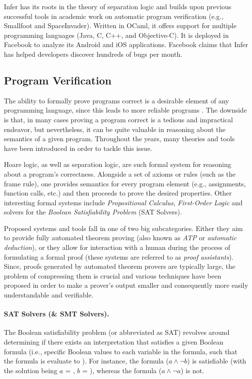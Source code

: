 Infer has its roots in the theory of separation logic and builds upon previous successful tools in academic work on automatic program verification (e.g., Smallfoot and SpaceInvader). Written in OCaml, it offers support for multiple programming languages (Java, C, C++, and Objective-C). It is deployed in Facebook to analyze its Android and iOS applications. Facebook claims that Infer has helped developers discover hundreds of bugs per month.


\subsection{Program Verification}

The ability to formally prove programs correct is a desirable element of any programming language, since this leads to more reliable programs \cite{article:1988:Fetzer,cav:2006:Bouajjani}. The downside is that, in many cases proving a program correct is a tedious and impractical endeavor, but nevertheless, it can be quite valuable in reasoning about the semantics of a given program. Throughout the years, many theories and tools have been introduced in order to tackle this issue.

Hoare logic, as well as separation logic, are such formal system for reasoning about a program's correctness. Alongside a set of axioms or rules (such as the frame rule), one provides semantics for every program element (e.g., assignments, function calls, etc.) and then proceeds to prove the desired properties. Other interesting formal systems include \emph{Propositional Calculus}, \emph{First-Order Logic} and solvers for the \emph{Boolean Satisfiability Problem} (SAT Solvers).

Proposed systems and tools fall in one of two big subcategories. Either they aim to provide fully automated theorem proving (also known as \emph{ATP} or \emph{automatic deduction}), or they allow for interaction with a human during the process of formulating a formal proof (these systems are referred to as \emph{proof assistants}). Since, proofs generated by automated theorem provers are typically large, the problem of compressing them is crucial and various techniques have been proposed in order to make a prover's output smaller and consequently more easily understandable and verifiable.


\paragraph{SAT Solvers (\& SMT Solvers).}
The Boolean satisfiability problem (or abbreviated as SAT) revolves around determining if there exists an interpretation that satisfies a given Boolean formula (i.e., specific Boolean values to each variable in the formula, such that the formula is evaluate to ). For instance, the formula ($a \land \neg b$) is satisfiable (with the solution being $a$ = , $b$ = ), whereas the formula ($a \land \neg a$) is not.

